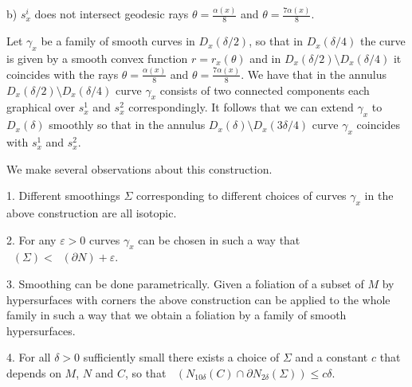 \documentclass[12pt]{amsart}
\DeclareMathOperator{\Hn}{\mathcal{H}^n}
\theoremstyle{definition}
\begin{document}
b)  $s_x^i$ does not intersect geodesic rays $\theta = \frac{\alpha(x)}{8}$
and $\theta = \frac{7\alpha(x)}{8}$.

Let $\gamma_x$ be a family of smooth curves in $D_x(\delta/2)$,
so that in $D_x(\delta/4)$ the curve is given by a smooth convex
function $r= r_x(\theta)$
and in $D_x(\delta/2) \setminus D_x(\delta/4)$
it coincides with the rays $\theta = \frac{\alpha(x)}{8}$
and $\theta = \frac{7\alpha(x)}{8}$.
We have that in the annulus $D_x(\delta/2) \setminus D_x(\delta/4)$
curve
$\gamma_x$ consists of two connected components each graphical
over $s_x^1$ and $s_x^2$ correspondingly.
It follows that we can extend $\gamma_x$ to $D_x(\delta)$
smoothly so that in the annulus $D_x(\delta) \setminus D_x(3\delta/4)$
curve $\gamma_x$ coincides with $s_x^1$ and $s_x^2$.

We make several observations about this construction.

1. Different smoothings $\Sigma$ corresponding to different choices 
of curves $\gamma_x$ in the above construction are all isotopic.

2. For any $\varepsilon> 0$ curves $\gamma_x$ can be chosen in such a way that 
$\Hn(\Sigma) < \Hn(\partial N) + \varepsilon$.

3. Smoothing can be done parametrically. Given a foliation of a subset of $M$ by hypersurfaces with corners
the above construction can be applied to the whole family in such a way that
we obtain a foliation by a family of smooth hypersurfaces.

4. For all $\delta>0$ sufficiently small there exists a choice
of $\Sigma$ and a constant $c$ that depends on $M$, $N$ and $C$, so that 
$\Hn(  N_{10 \delta}(C) \cap \partial N_{2 \delta}(\Sigma)) 
\leq c \delta$.
\end{document}
